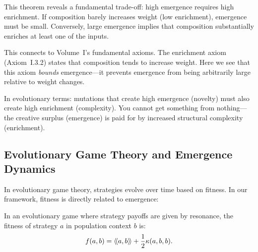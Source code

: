 \begin{interpretation}
This theorem reveals a fundamental trade-off: high emergence requires high
enrichment. If composition barely increases weight (low enrichment), emergence
must be small. Conversely, large emergence implies that composition substantially
enriches at least one of the inputs.

This connects to Volume~I's fundamental axioms. The enrichment axiom
(Axiom~I.3.2) states that composition tends to increase weight. Here we see
that this axiom \emph{bounds} emergence---it prevents emergence from being
arbitrarily large relative to weight changes.

In evolutionary terms: mutations that create high emergence (novelty) must also
create high enrichment (complexity). You cannot get something from nothing---the
creative surplus (emergence) is paid for by increased structural complexity
(enrichment).
\end{interpretation}



\subsection{Evolutionary Game Theory and Emergence Dynamics}

In evolutionary game theory, strategies evolve over time based on fitness.
In our framework, fitness is directly related to emergence:

\begin{theorem}
\label{thm:fitness-emergence}
In an evolutionary game where strategy payoffs are given by resonance, the
fitness of strategy $a$ in population context $b$ is:
\[
  f(a, b) = \langle\!\langle a, b \rangle\!\rangle + \frac{1}{2}\kappa(a, b, b).
\]
\end{theorem}

